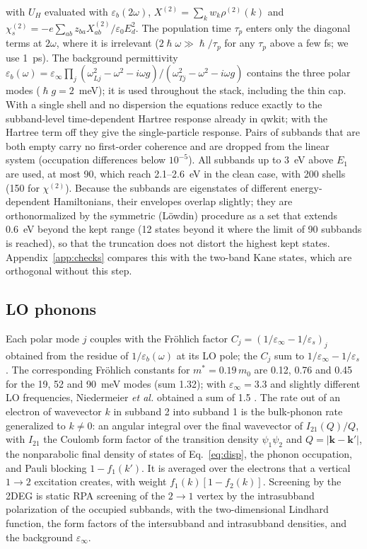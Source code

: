 \documentclass[11pt]{article}
\begin{document}
with $U_H$ evaluated with $\varepsilon_b(2\omega)$, $X^{(2)}=\sum_kw_k\rho^{(2)}(k)$ and $\chi^{(2)}_s=-e\sum_{ab}z_{ba}X^{(2)}_{ab}/\varepsilon_0E_d^2$. The population time $\tau_p$ enters only the diagonal terms at $2\omega$, where it is irrelevant ($2\hslash\omega\gg\hslash/\tau_p$ for any $\tau_p$ above a few fs; we use 1~ps). The background permittivity $\varepsilon_b(\omega)=\varepsilon_\infty\prod_j(\omega_{Lj}^2-\omega^2-i\omega g)/(\omega_{Tj}^2-\omega^2-i\omega g)$ contains the three polar modes ($\hslash g=2$~meV); it is used throughout the stack, including the thin cap. With a single shell and no dispersion the equations reduce exactly to the subband-level time-dependent Hartree response \cite{AllenTsuiVinter1976,Ando1977,AndoRMP1982} already in qwkit; with the Hartree term off they give the single-particle response. Pairs of subbands that are both empty carry no first-order coherence and are dropped from the linear system (occupation differences below $10^{-5}$). All subbands up to 3~eV above $E_1$ are used, at most 90, which reach 2.1--2.6~eV in the clean case, with 200 shells (150 for $\chi^{(2)}$). Because the subbands are eigenstates of different energy-dependent Hamiltonians, their envelopes overlap slightly; they are orthonormalized by the symmetric (L\"owdin) procedure \cite{Lowdin1950} as a set that extends 0.6~eV beyond the kept range (12 states beyond it where the limit of 90 subbands is reached), so that the truncation does not distort the highest kept states. Appendix~\ref{app:checks} compares this with the two-band Kane states, which are orthogonal without this step.

\subsection{LO phonons}
Each polar mode $j$ couples with the Fr\"ohlich factor $C_j=(1/\varepsilon_\infty-1/\varepsilon_s)_j$ obtained from the residue of $1/\varepsilon_b(\omega)$ at its LO pole; the $C_j$ sum to $1/\varepsilon_\infty-1/\varepsilon_s$ \cite{Varga1965}. The corresponding Fr\"ohlich constants for $m^*=0.19\,m_0$ are 0.12, 0.76 and 0.45 for the 19, 52 and 90~meV modes (sum 1.32); with $\varepsilon_\infty=3.3$ and slightly different LO frequencies, Niedermeier \emph{et al.} obtained a sum of 1.5 \cite{NiedermeierPolaronArxiv}. The rate out of an electron of wavevector $k$ in subband 2 into subband 1 is the bulk-phonon rate \cite{Ridley1982} generalized to $k\neq0$: an angular integral over the final wavevector of $I_{21}(Q)/Q$, with $I_{21}$ the Coulomb form factor of the transition density $\psi_1\psi_2$ and $Q=|\mathbf k-\mathbf k'|$, the nonparabolic final density of states of Eq.~\eqref{eq:disp}, the phonon occupation, and Pauli blocking $1-f_1(k')$. It is averaged over the electrons that a vertical $1\to2$ excitation creates, with weight $f_1(k)[1-f_2(k)]$. Screening by the 2DEG is static RPA screening of the $2\to1$ vertex by the intrasubband polarization of the occupied subbands, with the two-dimensional Lindhard function, the form factors of the intersubband and intrasubband densities, and the background $\varepsilon_\infty$.
\end{document}
